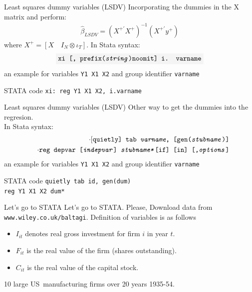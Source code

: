 \begin{frame}{Least squares dummy variables (LSDV)}
	Incorporating the dummies in the X matrix and perform:%
		\begin{gather}
			\widehat{\beta}_{LSDV}=\left(X^{+\prime}X^{+}\right) ^{-1}\left(X^{+\prime }y^{+}\right)
		\end{gather}
	where $X^{+}=\left[ X\quad I_{N}\otimes \iota _{T}\right] .$ In Stata syntax:
		$$\colorbox{codegray}{\texttt{xi [, prefix(\textit{string})noomit] i. varname}}$$
	an example for variables \colorbox{codegray}{\texttt{Y1 X1 X2}} and group identifier \colorbox{codegray}{\texttt{varname}}
		\begin{exampleblock}{STATA code}
			\centering
			\texttt{\textcolor{codeblue}{xi}: \textcolor{codeblue}{reg} Y1 X1 X2, i.varname}
		\end{exampleblock}
\end{frame}
\begin{frame}{Least squares dummy variables (LSDV)}
	Other way to get the dummies into the regresion.\\
	In Stata syntax:
		\begin{eqnarray*}
			&&\cdot \text{[\texttt{quietly] tab \textit{varname}, [gen(\textit{stubname}%
					)]}} \\
			&&\cdot \text{\texttt{reg depvar [\textit{indepvar}] \textit{stubname*}[if]
					[in] [,\textit{options}]}}
		\end{eqnarray*}%
	an example for variables \colorbox{codegray}{\texttt{Y1 X1 X2}} and group identifier \colorbox{codegray}{\texttt{varname}}
	    \begin{exampleblock}{STATA code}
	    	\centering
	    		\texttt{\textcolor{codeblue}{quietly tab} id, gen(dum)}\\
	    		\hspace{-1.65cm} \texttt{\textcolor{codeblue}{reg} Y1 X1 X2 dum*}
		\end{exampleblock}
\end{frame}
\begin{frame}{Let's go to STATA}
	Let's go to STATA. Please, Download data from \colorbox{codegray}{\texttt{\textcolor{codecrimson}{\textquotedbl www.wiley.co.uk/baltagi\textquotedbl}}}. Definition of variables is as follows
		\begin{itemize}
			\item $I_{it}$ denotes real gross investment for firm $i$ in year $t.$
			\item $F_{it}$ is the real value of the firm (shares outstanding).
			\item $C_{it}$ is the real value of the capital stock.
		\end{itemize}
	10 large US\ manufacturing firms over 20 years 1935-54.
\end{frame}
